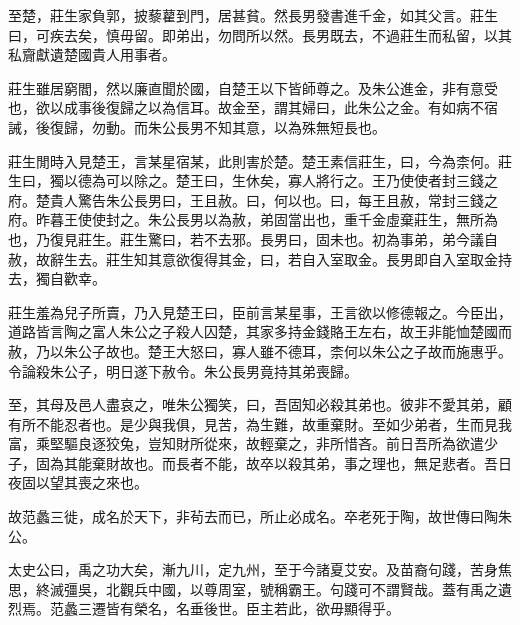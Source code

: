 至楚，莊生家負郭，披藜藋到門，居甚貧。然長男發書進千金，如其父言。莊生曰，可疾去矣，慎毋留。即弟出，勿問所以然。長男既去，不過莊生而私留，以其私齎獻遺楚國貴人用事者。

莊生雖居窮閻，然以廉直聞於國，自楚王以下皆師尊之。及朱公進金，非有意受也，欲以成事後復歸之以為信耳。故金至，謂其婦曰，此朱公之金。有如病不宿誡，後復歸，勿動。而朱公長男不知其意，以為殊無短長也。

莊生閒時入見楚王，言某星宿某，此則害於楚。楚王素信莊生，曰，今為柰何。莊生曰，獨以德為可以除之。楚王曰，生休矣，寡人將行之。王乃使使者封三錢之府。楚貴人驚告朱公長男曰，王且赦。曰，何以也。曰，每王且赦，常封三錢之府。昨暮王使使封之。朱公長男以為赦，弟固當出也，重千金虛棄莊生，無所為也，乃復見莊生。莊生驚曰，若不去邪。長男曰，固未也。初為事弟，弟今議自赦，故辭生去。莊生知其意欲復得其金，曰，若自入室取金。長男即自入室取金持去，獨自歡幸。

莊生羞為兒子所賣，乃入見楚王曰，臣前言某星事，王言欲以修德報之。今臣出，道路皆言陶之富人朱公之子殺人囚楚，其家多持金錢賂王左右，故王非能恤楚國而赦，乃以朱公子故也。楚王大怒曰，寡人雖不德耳，柰何以朱公之子故而施惠乎。令論殺朱公子，明日遂下赦令。朱公長男竟持其弟喪歸。

至，其母及邑人盡哀之，唯朱公獨笑，曰，吾固知必殺其弟也。彼非不愛其弟，顧有所不能忍者也。是少與我俱，見苦，為生難，故重棄財。至如少弟者，生而見我富，乘堅驅良逐狡兔，豈知財所從來，故輕棄之，非所惜吝。前日吾所為欲遣少子，固為其能棄財故也。而長者不能，故卒以殺其弟，事之理也，無足悲者。吾日夜固以望其喪之來也。

故范蠡三徙，成名於天下，非茍去而已，所止必成名。卒老死于陶，故世傳曰陶朱公。

太史公曰，禹之功大矣，漸九川，定九州，至于今諸夏艾安。及苗裔句踐，苦身焦思，終滅彊吳，北觀兵中國，以尊周室，號稱霸王。句踐可不謂賢哉。蓋有禹之遺烈焉。范蠡三遷皆有榮名，名垂後世。臣主若此，欲毋顯得乎。